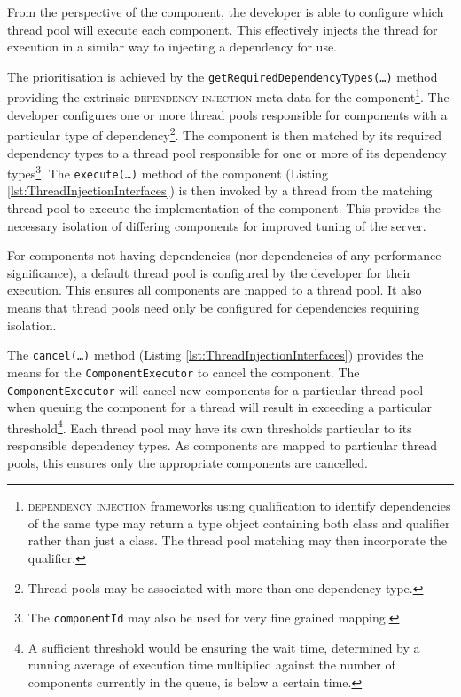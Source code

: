 \documentclass[prodmode]{style/acmlarge}
\begin{document}
From the perspective of the component, the developer is able to configure which
thread pool will execute each component.  This effectively injects the thread
for execution in a similar way to injecting a dependency for use.

The prioritisation is achieved by the
\texttt{getRequiredDependencyTypes(\ldots)} method providing the extrinsic
\textsc{dependency injection} \cite{ioc} meta-data for the
component\footnote{\textsc{dependency injection} frameworks using qualification
to identify dependencies of the same type may return a type object containing
both class and qualifier rather than just a class.  The thread pool matching may
then incorporate the qualifier.}.  The developer configures one or more thread
pools responsible for components with a particular type of
dependency\footnote{Thread pools may be associated with more than one dependency
type.}.  The component is then matched by its required dependency types to a
thread pool responsible for one or more of its dependency types\footnote{The
\texttt{componentId} may also be used for very fine grained mapping.}.  The
\texttt{execute(\ldots)} method of the component (Listing
\ref{lst:ThreadInjectionInterfaces}) is then invoked by a thread from the
matching thread pool to execute the implementation of the component.
This provides the necessary isolation of differing components for improved
tuning of the server.

For components not having dependencies (nor dependencies of any
performance significance), a default thread pool is configured by the developer
for their execution.  This ensures all components are mapped to a
thread pool.  It also means that thread pools need only be configured for
dependencies requiring isolation.

The \texttt{cancel(\ldots)} method (Listing \ref{lst:ThreadInjectionInterfaces})
provides the means for the \texttt{ComponentExecutor} to cancel the component.
The \texttt{ComponentExecutor} will cancel new components for a particular
thread pool when queuing the component for a thread will result in exceeding a
particular threshold\footnote{A sufficient threshold would be ensuring the wait
time, determined by a running average of execution time multiplied against the
number of components currently in the queue, is below a certain time.}.  Each
thread pool may have its own thresholds particular to its responsible dependency
types.  As components are mapped to particular thread pools, this ensures only
the appropriate components are cancelled.
\end{document}
